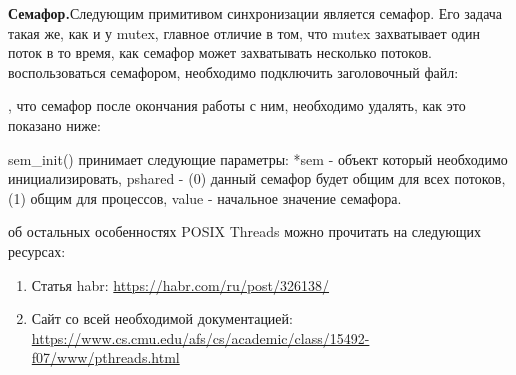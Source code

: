 {\begin{figure}[H]
		
	\end{figure}
	\par\textbf{Семафор.}Следующим примитивом синхронизации является семафор. Его задача такая же, как и у mutex, главное отличие в том, что mutex захватывает один поток в то время, как семафор может захватывать несколько потоков.
	 воспользоваться семафором, необходимо подключить заголовочный файл:
	\begin{figure}[H]
		
	\end{figure}
	, что семафор после окончания работы с ним, необходимо удалять, как это показано ниже:
	\begin{figure}[H]
		
	\end{figure}
	 sem\_init() принимает следующие параметры: *sem - объект который необходимо инициализировать, pshared - (0) данный семафор будет общим для всех потоков, (1) общим для процессов, value - начальное значение семафора.
		\par{} об остальных особенностях POSIX Threads можно прочитать на следующих ресурсах:
	\begin{enumerate}
		\sloppy
		\item Статья habr: \url{https://habr.com/ru/post/326138/}
		\item Сайт со всей необходимой документацией: \url{https://www.cs.cmu.edu/afs/cs/academic/class/15492-f07/www/pthreads.html}
	\end{enumerate}
}